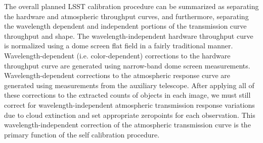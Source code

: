 \documentclass[12pt,preprint]{aastex}
\begin{document}
The overall planned LSST calibration procedure can
be summarized as separating the hardware and atmospheric throughput
curves, and furthermore, separating the wavelength dependent and
independent portions of the transmission curve throughput and
shape. The wavelength-independent hardware throughput curve is
normalized using a dome screen flat field in a fairly traditional
manner. Wavelength-dependent (i.e. color-dependent) corrections to the
hardware throughput curve are generated using narrow-band dome screen
measurements. Wavelength-dependent corrections to the atmospheric
response curve are generated using measurements from the auxiliary
telescope. After applying all of these corrections to the extracted
counts of objects in each image, we must still correct for
wavelength-independent atmospheric transmission response variations
due to cloud extinction and set appropriate zeropoints for each
observation. This wavelength-independent correction of the
atmospheric transmission curve is the primary function of the
self calibration procedure.




\end{document}

